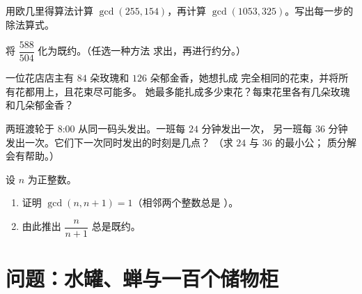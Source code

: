 \begin{exercise}[$\star\star$]\label{exo:g9:arith:6}
用欧几里得算法计算 $\gcd(255, 154)$，再计算
$\gcd(1053, 325)$。写出每一步的除法算式。
\end{exercise}

\begin{exercise}[$\star\star$]\label{exo:g9:arith:7}
将 $\dfrac{588}{504}$ 化为既约。（任选一种方法
求出，再进行约分。）
\end{exercise}

\begin{exercise}[$\star\star$]\label{exo:g9:arith:8}
一位花店店主有 $84$ 朵玫瑰和 $126$ 朵郁金香，她想扎成
完全相同的花束，并将所有花都用上，且花束尽可能多。
她最多能扎成多少束花？每束花里各有几朵玫瑰和几朵郁金香？
\end{exercise}

\begin{exercise}[$\star\star$]\label{exo:g9:arith:9}
两班渡轮于 8:00 从同一码头发出。一班每 $24$ 分钟发出一次，
另一班每 $36$ 分钟发出一次。它们下一次同时发出的时刻是几点？
（求 $24$ 与 $36$ 的最小公；
质分解会有帮助。）
\end{exercise}

\begin{exercise}[$\star\star\star$]\label{exo:g9:arith:10}
设 $n$ 为正整数。
\begin{enumerate}
  \item 证明 $\gcd(n, n+1) = 1$（相邻两个整数总是
        ）。
  \item 由此推出 $\dfrac{n}{n+1}$ 总是既约。
\end{enumerate}
\end{exercise}

\section{问题：水罐、蝉与一百个储物柜}

